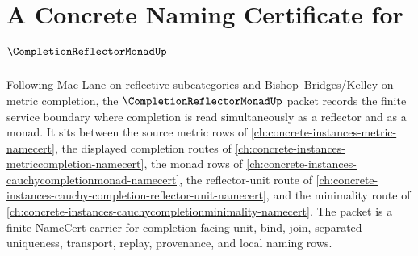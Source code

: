 \chapter{A Concrete Naming Certificate for $\CompletionReflectorMonadUp$}
\label{ch:concrete-instances-completion-reflector-monad-namecert}

Following Mac Lane on reflective subcategories and Bishop--Bridges/Kelley on metric completion, the $\CompletionReflectorMonadUp$ packet records the finite service boundary where completion is read simultaneously as a reflector and as a monad. It sits between the source metric rows of \autoref{ch:concrete-instances-metric-namecert}, the displayed completion routes of \autoref{ch:concrete-instances-metriccompletion-namecert}, the monad rows of \autoref{ch:concrete-instances-cauchycompletionmonad-namecert}, the reflector-unit route of \autoref{ch:concrete-instances-cauchy-completion-reflector-unit-namecert}, and the minimality route of \autoref{ch:concrete-instances-cauchycompletionminimality-namecert}. The packet is a finite NameCert carrier for completion-facing unit, bind, join, separated uniqueness, transport, replay, provenance, and local naming rows.

